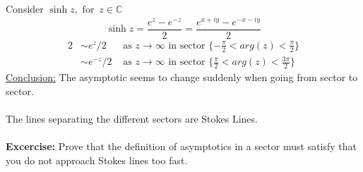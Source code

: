\documentclass{article}
\begin{document}
\\
\\
Consider $\sinh z, \mbox{ for }\, z \in \mathbb{C} $
\[ \sinh z = \frac{e^z- e^{-z}}{2} = \frac{e^{x+iy} - e^{-x-iy}}{2} \]
\begin{alignat*}{2}
& \sim  e^z/2 &\mbox{ as } z \to \infty \mbox{ in sector } \{ -\frac{\pi}{2}
< arg(z) < \frac{\pi}{2} \} \\
& \sim  e^{-z}/2 &\mbox{ as } z \to \infty \mbox{ in sector } \{ \frac{\pi}{2}
< arg(z) < \frac{3\pi}{2} \} 
\end{alignat*}
\underline{Conclusion:} The asymptotic seems to change suddenly when going from
sector to sector. %
\\
\\
The lines separating the different sectors are Stokes Lines.
\\
\\
\textbf{Excercise:} Prove that the definition of asymptotics in a sector must satisfy
that you do not approach Stokes lines too fast.
\end{document}
